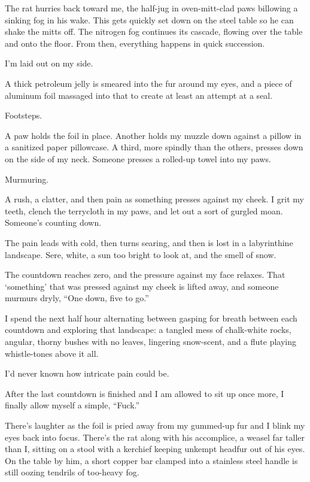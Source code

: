 The rat hurries back toward me, the half-jug in oven-mitt-clad paws billowing a sinking fog in his wake. This gets quickly set down on the steel table so he can shake the mitts off. The nitrogen fog continues its cascade, flowing over the table and onto the floor. From then, everything happens in quick succession.

I'm laid out on my side.

A thick petroleum jelly is smeared into the fur around my eyes, and a piece of aluminum foil massaged into that to create at least an attempt at a seal.

Footsteps.

A paw holds the foil in place. Another holds my muzzle down against a pillow in a sanitized paper pillowcase. A third, more spindly than the others, presses down on the side of my neck. Someone presses a rolled-up towel into my paws.

Murmuring.

A rush, a clatter, and then pain as something presses against my cheek. I grit my teeth, clench the terrycloth in my paws, and let out a sort of gurgled moan. Someone's counting down.

The pain leads with cold, then turns searing, and then is lost in a labyrinthine landscape. Sere, white, a sun too bright to look at, and the smell of snow.

The countdown reaches zero, and the pressure against my face relaxes. That `something' that was pressed against my cheek is lifted away, and someone murmurs dryly, ``One down, five to go.''

I spend the next half hour alternating between gasping for breath between each countdown and exploring that landscape: a tangled mess of chalk-white rocks, angular, thorny bushes with no leaves, lingering snow-scent, and a flute playing whistle-tones above it all.

I'd never known how intricate pain could be.

After the last countdown is finished and I am allowed to sit up once more, I finally allow myself a simple, ``Fuck.''

There's laughter as the foil is pried away from my gummed-up fur and I blink my eyes back into focus. There's the rat along with his accomplice, a weasel far taller than I, sitting on a stool with a kerchief keeping unkempt headfur out of his eyes. On the table by him, a short copper bar clamped into a stainless steel handle is still oozing tendrils of too-heavy fog.

